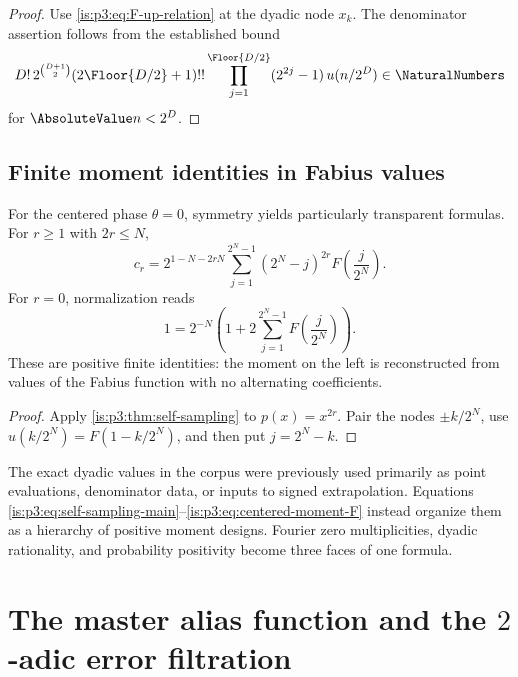 \begin{proof}
Use \eqref{is:p3:eq:F-up-relation} at the dyadic node $x_k$.  The denominator assertion follows from the established bound
\[
 D!\,2^{\binom{D+1}{2}}(2\Floor{D/2}+1)!!
 \prod_{j=1}^{\Floor{D/2}}(2^{2j}-1)\,u(n/2^D)\in\NaturalNumbers
\]
for $\AbsoluteValue n<2^D$.
\end{proof}

\subsection{Finite moment identities in Fabius values}

For the centered phase $\theta=0$, symmetry yields particularly transparent formulas.  For $r\ge1$ with $2r\le N$,
\begin{equation}
 \boxed{\displaystyle
 c_r=2^{1-N-2rN}
 \sum_{j=1}^{2^N-1}(2^N-j)^{2r}
 F\!\left(\frac j{2^N}\right).}
 \label{is:p3:eq:centered-moment-F}
\end{equation}
For $r=0$, normalization reads
\begin{equation}
 1=2^{-N}\left(1+2\sum_{j=1}^{2^N-1}F\!\left(\frac j{2^N}\right)\right).
 \label{is:p3:eq:centered-normalization-F}
\end{equation}
These are positive finite identities: the moment on the left is reconstructed from values of the Fabius function with no alternating coefficients.

\begin{proof}
Apply \cref{is:p3:thm:self-sampling} to $p(x)=x^{2r}$.  Pair the nodes $\pm k/2^N$, use $u(k/2^N)=F(1-k/2^N)$, and then put $j=2^N-k$.
\end{proof}

\begin{resultbox}
The exact dyadic values in the corpus were previously used primarily as point evaluations, denominator data, or inputs to signed extrapolation.  Equations \eqref{is:p3:eq:self-sampling-main}--\eqref{is:p3:eq:centered-moment-F} instead organize them as a hierarchy of positive moment designs.  Fourier zero multiplicities, dyadic rationality, and probability positivity become three faces of one formula.
\end{resultbox}

\section{The master alias function and the
\texorpdfstring{$2$}{2}-adic error filtration}
\label{is:p3:sec:alias}

